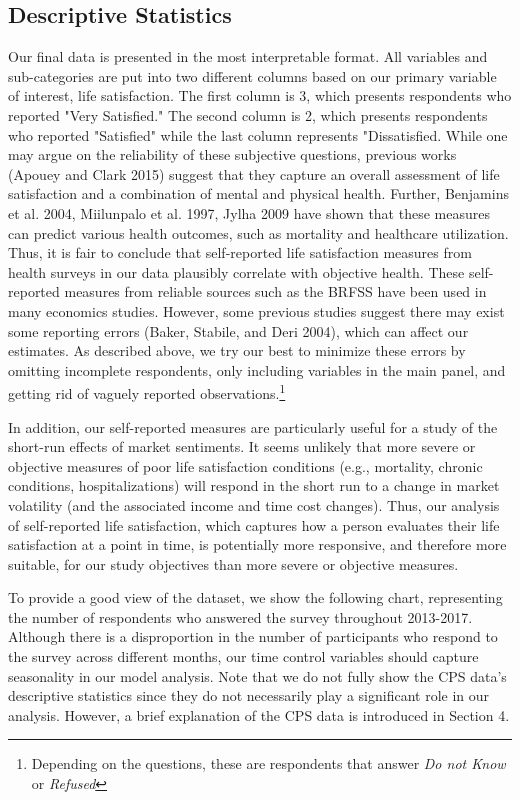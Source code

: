 \documentclass[11pt,a4paper,oldfontcommands]{memoir}
\begin{document}
{\subsection{Descriptive Statistics}

Our final data is presented in the most interpretable format. All variables and sub-categories are put into two different columns based on our primary variable of interest, life satisfaction. The first column is 3, which presents respondents who reported "Very Satisfied." The second column is 2, which presents respondents who reported "Satisfied" while the last column represents "Dissatisfied. While one may argue on the reliability of these subjective questions, previous works (Apouey and Clark 2015) suggest that they capture an overall assessment of life satisfaction and a combination of mental and physical health. Further, Benjamins et al. 2004, Miilunpalo et al. 1997, Jylha 2009 have shown that these measures can predict various health outcomes, such as mortality and healthcare utilization. Thus, it is fair to conclude that self-reported life satisfaction measures from health surveys in our data plausibly correlate with objective health. These self-reported measures from reliable sources such as the BRFSS have been used in many economics studies. However, some previous studies suggest there may exist some reporting errors (Baker, Stabile, and Deri 2004), which can affect our estimates. As described above, we try our best to minimize these errors by omitting incomplete respondents, only including variables in the main panel, and getting rid of vaguely reported observations.\footnote{Depending on the questions, these are respondents that answer \textit{Do not Know} or \textit{Refused}}



In addition, our self-reported measures are particularly useful for a study of the short-run effects of market sentiments. It seems unlikely that more severe or objective measures of poor life satisfaction conditions (e.g., mortality, chronic conditions, hospitalizations) will respond in the short run to a change in market volatility (and the associated income and time cost changes). Thus, our analysis of self-reported life satisfaction, which captures how a person evaluates their life satisfaction at a point in time, is potentially more responsive, and therefore more suitable, for our study objectives than more severe or objective measures.

To provide a good view of the dataset, we show the following chart, representing the number of respondents who answered the survey throughout 2013-2017. Although there is a disproportion in the number of participants who respond to the survey across different months, our time control variables should capture seasonality in our model analysis. Note that we do not fully show the CPS data's descriptive statistics since they do not necessarily play a significant role in our analysis. However, a brief explanation of the CPS data is introduced in Section 4.

}
\end{document}
